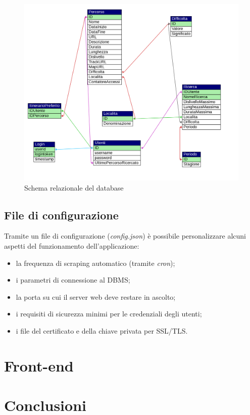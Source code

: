 \documentclass[11pt]{report}
\begin{document}
\begin{figure}
	\centering
	\includegraphics[scale=0.45]{DB_schema}
	\caption{Schema relazionale del database \label{db_schema}}
\end{figure}
\subsection{File di configurazione}
Tramite un file di configurazione (\textit{config.json}) è possibile personalizzare alcuni aspetti del funzionamento dell'applicazione:
\begin{itemize}
	\item la frequenza di scraping automatico (tramite \textit{cron});
	\item i parametri di connessione al DBMS;
	\item la porta su cui il server web deve restare in ascolto;
	\item i requisiti di sicurezza minimi per le credenziali degli utenti;
	\item i file del certificato e della chiave privata per SSL/TLS.
\end{itemize}

\section{Front-end}

\section{Conclusioni}
\end{document}
